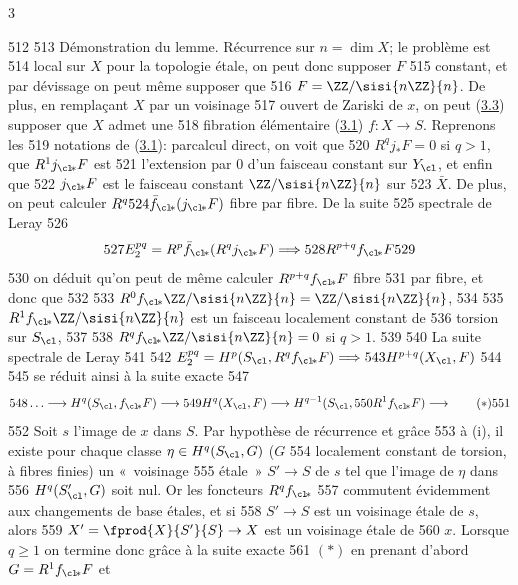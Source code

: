 3	\documentclass[10pt]{../fichiers-configuration-latex/smfart}
\begin{document}
   512	
   513	Démonstration du lemme. Récurrence sur $n=\dim X$; le problème est
   514	local sur $X$ pour la topologie étale,  on peut donc supposer $F$
   515	constant, et par dévissage on peut même supposer que
   516	$F=\ZZ/\sisi{n\ZZ}{n}$. De plus, en remplaçant $X$ par un voisinage
   517	ouvert de Zariski de $x$, on peut (\hyperref[XI.prop3.3]{3.3}) supposer que $X$ admet une
   518	fibration élémentaire (\hyperref[XI.def3.1]{3.1}) $f:X\rightarrow S$. Reprenons les
   519	notations de (\hyperref[XI.def3.1]{3.1}): par\pageoriginale calcul direct, on voit que
   520	$R^q{j}_{\ast}F=0$ si $q>1$, que $R^1j_{\cl\!\ast}F$ est
   521	l'extension par $0$ d'un faisceau constant sur $Y_{\cl}$, et enfin que
   522	$j_{\cl\!\ast}F$ est le faisceau constant $\ZZ/\sisi{n\ZZ}{n}$ sur
   523	$\bar{X}$. De plus, on peut calculer $R^q
   524	\bar{f}_{\cl\!\ast}(j_{\cl\!\ast}F)$ fibre par fibre. De la suite
   525	spectrale de Leray
   526	$$
   527	E^{pq}_2=R^p\bar{f}_{\cl\!\ast}(R^qj_{\cl\!\ast}F)\Longrightarrow
   528	R^{p+q}f_{\cl\!\ast}F
   529	$$
   530	on déduit qu'on peut de même calculer $R^{p+q}f_{\cl\!\ast}F$ fibre
   531	par fibre, et donc que 
   532	
   533	$R^0f_{\cl\!\ast}\ZZ/\sisi{n\ZZ}{n}=\ZZ/\sisi{n\ZZ}{n}$,
   534	
   535	$R^1f_{\cl\!\ast}\ZZ/\sisi{n\ZZ}{n}$ est un faisceau localement constant de
   536	  torsion sur $S_{\cl}$,
   537	
   538	$R^qf_{\cl\!\ast}\ZZ/\sisi{n\ZZ}{n}=0$ si $q>1$.
   539	
   540	La suite spectrale de Leray
   541	
   542	$E^{pq}_2=H^p(S_{\cl}, R^qf_{\cl\!\ast}F)\Longrightarrow
   543	H^{p+q}(X_{\cl},F)$
   544	
   545		se réduit ainsi à la suite exacte
   547	\begin{equation*}
   548	\ldots\longrightarrow H^q(S_{\cl},f_{\cl\!\ast}F)\longrightarrow
   549	H^q(X_{\cl},F)\longrightarrow H^{q-1}(S_{\cl},
   550	R^1f_{\cl\!\ast}F)\longrightarrow\tag{$\ast$}
   551	\end{equation*}
   552	Soit $s$ l'image de $x$ dans $S$. Par hypothèse de récurrence et grâce
   553	à (i), il existe pour chaque classe $\eta\in H^q(S_{\cl},G)$ ($G$
   554	localement constant de torsion, à fibres finies) un « voisinage
   555	étale » $S'\rightarrow S$ de $s$ tel que l'image de $\eta$ dans
   556	$H^q(S'_{\cl},G)$ soit nul. Or les foncteurs $R^qf_{\cl\!\ast}$
   557	commutent évidemment aux changements de base étales, et si
   558	$S'\rightarrow S$ est un voisinage étale de $s$, alors
   559	$X'=\fprod{X}{S'}{S}\rightarrow X$ est un voisinage étale de
   560	$x$. Lorsque $q\geq 1$ on termine donc grâce à la suite exacte
   561	$(\ast)$ en prenant d'abord $G=R^1f_{\cl\!\ast}F$ et
\end{document}
